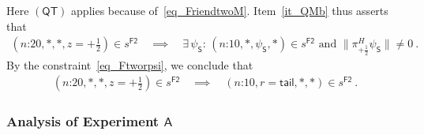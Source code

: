 \documentclass{article}
\theoremstyle{plain}
\theoremstyle{definition}
\newcommand*{\Friendtwo}{\mathsf{F2}}
\newcommand*{\Assistant}{\mathsf{A}}
\newcommand*{\Spin}{\mathsf{S}}
\newcommand*{\splus}{{\textstyle + \frac{1}{2}}}
\newcommand*{\QT}{\mathsf{(QT)}}
\newcommand*{\tail}{\mathsf{tail}}
\begin{document}
Here $\QT$ applies because of~\eqref{eq_FriendtwoM}. Item~\ref{it_QMb} thus asserts that
\begin{align*}
   (\text{$n$:20}, *, *, z=\splus) \in s^{\Friendtwo}  \quad \implies \quad \exists \, \psi_{\Spin} : \,  (\text{$n$:10}, *, \psi_{\Spin}, *) \in s^{\Friendtwo} \text{ and } \|\pi^H_{+\frac{1}{2}} \psi_{\Spin}\| \neq 0  \ .
\end{align*}
By the constraint~\eqref{eq_Ftworpsi}, we conclude that
\begin{align} \label{eq_QTFriendtwo}
  (\text{$n$:20}, *, *, z = \splus) \in s^{\Friendtwo} \quad \implies \quad 
(\text{$n$:10}, r = \tail, *, *) \in s^{\Friendtwo} \ .
\end{align}

\subsubsection*{Analysis of Experiment $\Assistant$}  
\end{document}
